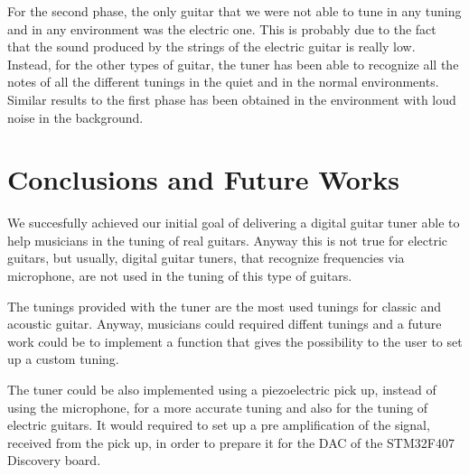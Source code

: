 For the second phase, the only guitar that we were not able to tune in any tuning and in any environment was the electric one. This is probably due to the fact that the sound produced by the strings of the electric guitar is really low. Instead, for the other types of guitar, the tuner has been able to recognize all the notes of all the different tunings in the quiet and in the normal environments. Similar results to the first phase has been obtained in the environment with loud noise in the background.

\section{Conclusions and Future Works}

We succesfully achieved our initial goal of delivering a digital guitar tuner able to help musicians in the tuning of real guitars. Anyway this is not true for electric guitars, but usually, digital guitar tuners, that recognize frequencies via microphone, are not used in the tuning of this type of guitars.

The tunings provided with the tuner are the most used tunings for classic and acoustic guitar. Anyway, musicians could required diffent tunings and a future work could be to implement a function that gives the possibility to the user to set up a custom tuning.

The tuner could be also implemented using a piezoelectric pick up, instead of using the microphone, for a more accurate tuning and also for the tuning of electric guitars. It would required to set up a pre amplification of the signal, received from the pick up, in order to prepare it for the DAC of the STM32F407 Discovery board. 
